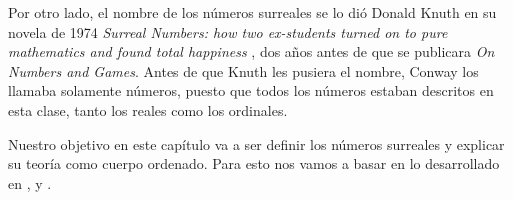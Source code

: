 Por otro lado, el nombre de los n\'umeros surreales se lo di\'o Donald Knuth en su novela de 1974 \textit{Surreal Numbers: how two ex-students turned on to pure mathematics and found total happiness} \cite{Knuth1974-wh}, dos a\~nos antes de que se publicara \textit{On Numbers and Games}. Antes de que Knuth les pusiera el nombre, Conway los llamaba solamente n\'umeros, puesto que todos los n\'umeros estaban descritos en esta clase, tanto los reales como los ordinales.

Nuestro objetivo en este cap\'itulo va a ser definir los n\'umeros surreales y explicar su teor\'ia como cuerpo ordenado. Para esto nos vamos a basar en lo desarrollado en \cite{Conway2000}, \cite{Tondering2019} y \cite{Gonshor1986}.

